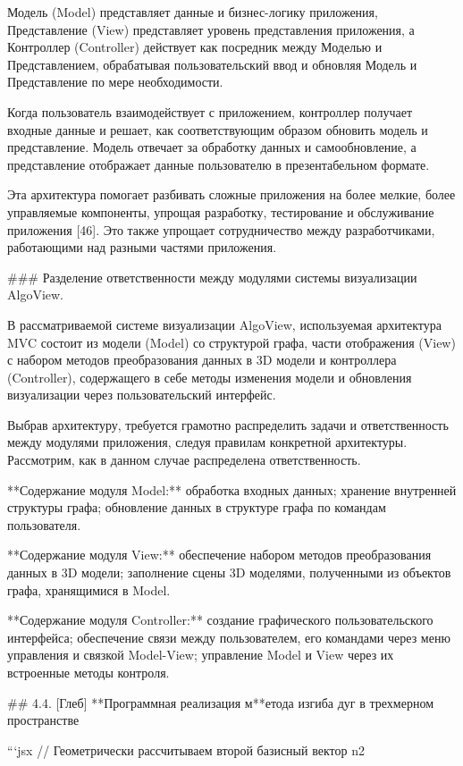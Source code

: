 Модель (Model) представляет данные и бизнес-логику приложения, Представление (View) представляет уровень представления приложения, а Контроллер (Controller) действует как посредник между Моделью и Представлением, обрабатывая пользовательский ввод и обновляя Модель и Представление по мере необходимости.

Когда пользователь взаимодействует с приложением, контроллер получает входные данные и решает, как соответствующим образом обновить модель и представление. Модель отвечает за обработку данных и самообновление, а представление отображает данные пользователю в презентабельном формате.

Эта архитектура помогает разбивать сложные приложения на более мелкие, более управляемые компоненты, упрощая разработку, тестирование и обслуживание приложения [46]. Это также упрощает сотрудничество между разработчиками, работающими над разными частями приложения.

### Разделение ответственности между модулями системы визуализации AlgoView.

В рассматриваемой системе визуализации AlgoView, используемая архитектура MVC состоит из модели (Model) со структурой графа, части отображения (View) с набором методов преобразования данных в 3D модели и контроллера (Controller), содержащего в себе методы изменения модели и обновления визуализации через пользовательский интерфейс.

Выбрав архитектуру, требуется грамотно распределить задачи и ответственность между модулями приложения, следуя правилам конкретной архитектуры. Рассмотрим, как в данном случае распределена ответственность.

**Содержание модуля Model:** обработка входных данных; хранение внутренней структуры графа; обновление данных в структуре графа по командам пользователя.

**Содержание модуля View:** обеспечение набором методов преобразования данных в 3D модели; заполнение сцены 3D моделями, полученными из объектов графа, хранящимися в Model.

**Содержание модуля Controller:** создание графического пользовательского интерфейса; обеспечение связи между пользователем, его командами через меню управления и связкой Model-View; управление Model и View через их встроенные методы контроля.

## 4.4. [Глеб] **Программная реализация м**етода изгиба дуг в трехмерном пространстве

```jsx
// Геометрически рассчитываем второй базисный вектор n2

